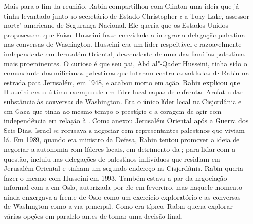 Mais para o fim da reunião, Rabin compartilhou com Clinton uma ideia que
já tinha levantado junto ao secretário de Estado Christopher e a Tony
Lake, assessor norte"-americano de Segurança Nacional. Ele queria que os
Estados Unidos propusessem que Faisal Husseini fosse convidado a
integrar a delegação palestina nas conversas de Washington. Husseini era
um líder respeitável e razoavelmente independente em Jerusalém Oriental,
descendente de uma das famílias palestinas mais proeminentes. O curioso
é que seu pai, Abd al"-Qader Husseini, tinha sido o comandante dos
milicianos palestinos que lutaram contra os soldados de Rabin na estrada
para Jerusalém, em 1948, e acabou morto em ação. Rabin explicou que
Husseini era o último exemplo de um líder local capaz de enfrentar
Arafat e dar substância às conversas de Washington. Era o único líder
local na Cisjordânia e em Gaza que tinha ao mesmo tempo o prestígio e a
coragem de agir com independência em relação à . Como anexou
Jerusalém Oriental após a Guerra dos Seis Dias, Israel se recusava a
negociar com representantes palestinos que viviam lá. Em 1989, quando
era ministro da Defesa, Rabin tentou promover a ideia de negociar a
autonomia com líderes locais, em detrimento da ; para lidar com a
questão, incluiu nas delegações de palestinos indivíduos que residiam em
Jerusalém Oriental e tinham um segundo endereço na Cisjordânia. Rabin
queria fazer o mesmo com Husseini em 1993. Também estava a par da
negociação informal com a  em Oslo, autorizada por ele em fevereiro,
mas naquele momento ainda enxergava a frente de Oslo como um exercício
exploratório e as conversas de Washington como a via principal. Como era
típico, Rabin queria explorar várias opções em paralelo antes de tomar
uma decisão final.

